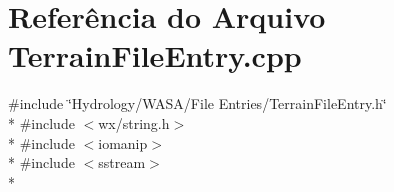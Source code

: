 \section{Referência do Arquivo Terrain\+File\+Entry.\+cpp}
\label{_terrain_file_entry_8cpp}
{\ttfamily \#include \char`\"{}Hydrology/\+W\+A\+S\+A/\+File Entries/\+Terrain\+File\+Entry.\+h\char`\"{}}\\*
{\ttfamily \#include $<$wx/string.\+h$>$}\\*
{\ttfamily \#include $<$iomanip$>$}\\*
{\ttfamily \#include $<$sstream$>$}\\*
